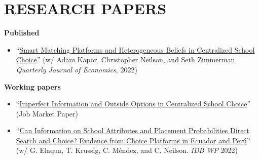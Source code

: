 \documentclass[letter,9pt]{extarticle}
\begin{document}
\section*{RESEARCH PAPERS}

\noindent
\textbf{Published}
\begin{itemize}
    \item ``\href{https://academic.oup.com/qje/article/137/3/1791/6544686?login=false}{Smart Matching Platforms and Heterogeneous Beliefs in Centralized School Choice}'' (w/ Adam Kapor, Christopher Neilson, and Seth Zimmerman. \textit{Quarterly Journal of Economics}, 2022)    \end{itemize}
\noindent
\textbf{Working papers} 
\begin{itemize}
    \item ``\href{https://fharteaga.github.io/pdfs/arteagaJMP.pdf}{Imperfect Information and Outside Options in Centralized School Choice}''  (Job Market Paper)
    \item ``\href{https://publications.iadb.org/en/can-information-school-attributes-and-placement-probabilities-direct-search-and-choice-evidence}{Can Information on School Attributes and Placement Probabilities Direct Search and Choice? Evidence from Choice Platforms in Ecuador and Perú}'' (w/ G. Elaqua, T. Krussig, C. Méndez, and C. Neilson. \textit{IDB WP} 2022)
\end{itemize}



\end{document}
